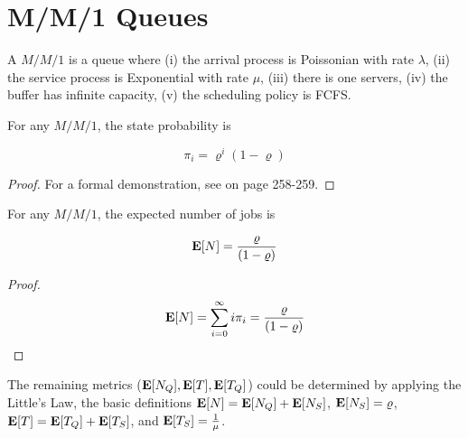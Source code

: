 \section{M/M/1 Queues}
\label{sec:M-M-1-queues}

A $M/M/1$ is a queue where 
(i) the arrival process is Poissonian with rate $\lambda$,
(ii) the service process is Exponential with rate $\mu$,
(iii) there is one servers,
(iv) the buffer has infinite capacity,
(v) the scheduling policy is FCFS.

	
\begin{theorem}
\label{thm:M-M-1-probability-state}	
	For any $M/M/1$, the state probability is
	
	\begin{equation}
	\label{eqn:M-M-1-probability-state}
	\pi_{i} = \varrho^{i}(1-\varrho)
	\end{equation}
	
	\begin{proof}
		For a formal demonstration, see \cite{harchol2013performance} on page 258-259.
	\end{proof}
\end{theorem}

\begin{theorem}
\label{thm:M-M-1-System-Jobs}	
	For any $M/M/1$, the expected number of jobs is
	
	\begin{equation}
	\label{eqn:M-M-1-System-Jobs}
	\expected{N} = \frac{\varrho}{(1-\varrho)}
	\end{equation}
	
	\begin{proof}
		\begin{equation*}
		\mathbf{E}[N] = \sum_{i=0}^{\infty} i \pi_{i} = \frac{\varrho}{(1-\varrho)}
		\end{equation*}
	\end{proof}
\end{theorem}

The remaining metrics ($\mathbf{E}[N_{Q}],\mathbf{E}[T],\mathbf{E}[T_{Q}]$) could be determined by applying the Little's Law, the basic definitions 
$\mathbf{E}[N]=\mathbf{E}[N_{Q}]+\mathbf{E}[N_{S}]$, 
$\mathbf{E}[N_{S}]=\varrho$, 
$\mathbf{E}[T]=\mathbf{E}[T_{Q}]+\mathbf{E}[T_{S}]$, and
$\mathbf{E}[T_{S}]=\frac{1}{\mu}$.

